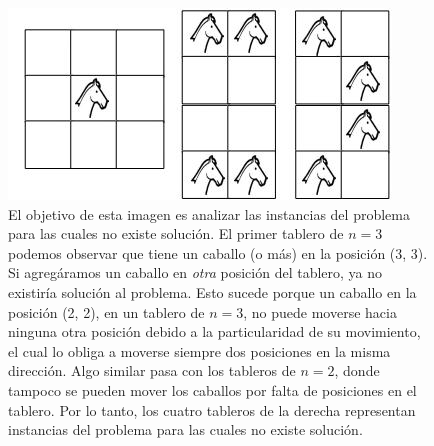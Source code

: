 \documentclass[a4paper]{article}
\begin{document}
\begin{figure}
\centering
\includegraphics[scale=0.7]{instsinsol.jpg}\caption{El objetivo de esta imagen es analizar las instancias del problema para las cuales no existe solución. El primer tablero de $n = 3$ podemos observar que tiene un caballo (o más) en la posición (3, 3). Si agregáramos un caballo en \textit{otra} posición del tablero, ya no existiría solución al problema. Esto sucede porque un caballo en la posición (2, 2), en un tablero de $n = 3$, no puede moverse hacia ninguna otra posición debido a la particularidad de su movimiento, el cual lo obliga a moverse siempre dos posiciones en la misma dirección. Algo similar pasa con los tableros de $n = 2$, donde tampoco se pueden mover los caballos por falta de posiciones en el tablero. Por lo tanto, los cuatro tableros de la derecha representan instancias del problema para las cuales no existe solución.}
\end{figure}
\end{document}
